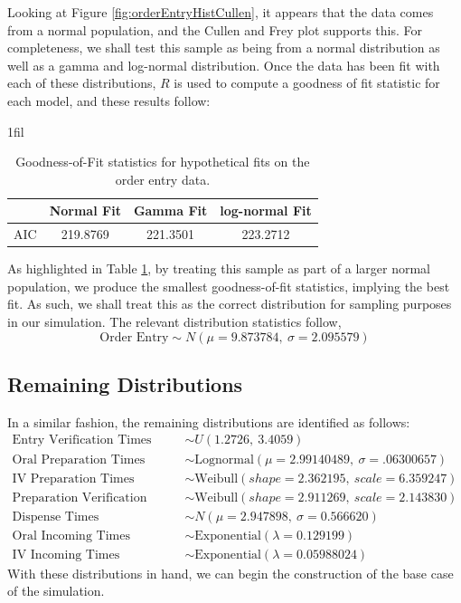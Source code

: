 \documentclass[10pt]{report}            %
\makeatletter
\newcommand*{\centerfloat}{%
  \parindent \z@
  \leftskip \z@ \@plus 1fil \@minus \textwidth
  \rightskip\leftskip
  \parfillskip \z@skip}
\makeatother
\begin{document}
Looking at Figure \ref{fig:orderEntryHistCullen}, it appears that the data comes from a normal population, and the Cullen and Frey plot supports this. For completeness, we shall test this sample as being from a normal distribution as well as a gamma and log-normal distribution. Once the data has been fit with each of these distributions, $R$ is used to compute a goodness of fit statistic for each model, and these results follow:
\begin{table}[H]
\centerfloat
\begin{tabular}{|r||c|c|c|}
\hline
& Normal Fit & Gamma Fit & log-normal Fit \\\hline
AIC & \cellcolor{green!25}219.8769 & 221.3501 & 223.2712\\\hline
\end{tabular}
\caption{Goodness-of-Fit statistics for hypothetical fits on the order entry data.}
\label{table:entryGOF}
\end{table}
As highlighted in Table \ref{table:entryGOF}, by treating this sample as part of a larger normal population, we produce the smallest goodness-of-fit statistics, implying the best fit. As such, we shall treat this as the correct distribution for sampling purposes in our simulation. The relevant distribution statistics follow,
\[\text{Order Entry}\sim N(\mu=9.873784,\ \sigma=2.095579)\]
\subsection*{Remaining Distributions}
In a similar fashion, the remaining distributions are identified as follows:
\begin{align*} 
\text{Entry Verification Times} &\sim U(1.2726,\ 3.4059)\\
\text{Oral Preparation Times} &\sim \text{Lognormal}(\mu=2.99140489,\ \sigma=.06300657)\\
\text{IV Preparation Times} &\sim \text{Weibull}(shape=2.362195,\ scale=6.359247)\\
\text{Preparation Verification Times} &\sim \text{Weibull}(shape=2.911269,\ scale=2.143830)\\
\text{Dispense Times} &\sim N(\mu=2.947898,\ \sigma=0.566620)\\
\text{Oral Incoming Times} &\sim \text{Exponential}(\lambda = 0.129199 )\\
\text{IV Incoming Times} &\sim \text{Exponential}(\lambda = 0.05988024 )
\end{align*}
With these distributions in hand, we can begin the construction of the base case of the simulation.
\end{document}
